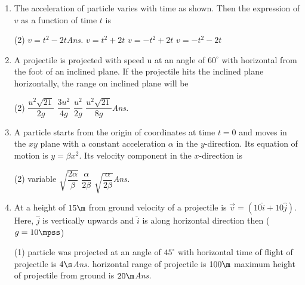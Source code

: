 \documentclass{article}
\newcommand{\ans}{\textcolor{red!95}{\textit{\quad Ans.}}}
\begin{document}
\begin{enumerate}
\item The acceleration of particle varies with time as shown. Then the expression of $v$ as a function of time $t$ is
\begin{center}
\end{center}
\begin{tasks}(2)
	\task $v=t^2-2t$\ans
	\task $v=t^2+2t$
	\task $v=-t^2+2t$
	\task $v=-t^2-2t$
\end{tasks}
	


\item A projectile is projected with speed u at an angle of $60^\circ$ with horizontal from the foot of an inclined plane. If the projectile hits the inclined plane horizontally, the range on inclined plane will be
\begin{tasks}(2)
	\task $\dfrac{u^2\sqrt{21}}{2g}$
	\task $\dfrac{3u^2}{4g}$
	\task $\dfrac{u^2}{2g}$
	\task $\dfrac{u^2\sqrt{21}}{8g}$\ans
\end{tasks}
            
            
\item A particle starts from the origin of coordinates at time $t = 0$ and moves in the $xy$ plane with a constant acceleration $\alpha$ in the $y$-direction. Its equation of motion is $y = \beta x^2$. Its velocity
component in the $x$-direction is  
\begin{tasks}(2)
	\task variable
	\task $\sqrt{\dfrac{2\alpha}{\beta}}$
	\task $\dfrac{\alpha}{2\beta}$
	\task $\sqrt{\dfrac{\alpha}{2\beta}}$\ans
\end{tasks}          
         

            
            
\item At a height of $15 \m$ from ground velocity of a projectile is $\vec{v} = (10 \hat{i} + 10\hat{j})$. Here, $\hat{j}$ is vertically upwards and $\hat{i}$ is along horizontal direction then ($g = 10 \mpss$)
\begin{tasks}(1)
	\task particle was projected at an angle of $45^\circ$ with horizontal
	\task time of flight of projectile is $4 \s$\ans
	\task horizontal range of projectile is $100 \m$
	\task maximum height of projectile from ground is $20 \m$\ans
\end{tasks}



\end{enumerate}
\end{document}
